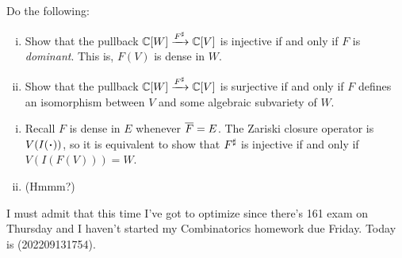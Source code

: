 \documentclass[12pt]{memoir}
\begin{document}
\begin{Ej}[2.5.(1,2)]
  Do the following:
  \begin{enumerate}[i)]
    \itemsep=-0.4em
    \item Show that the pullback $\mathbb{C}[W]\xrightarrow{F^\sharp}\mathbb{C}[V]$ is injective if and only if $F$ is \emph{dominant}. This is, $F(V)$ is dense in $W$.
    \item Show that the pullback $\mathbb{C}[W]\xrightarrow{F^\sharp}\mathbb{C}[V]$ is surjective if and only if $F$ defines an isomorphism between $V$ and some algebraic subvariety of $W$.
  \end{enumerate}
 \end{Ej}
 \begin{ptcbr}
  \begin{enumerate}[i)]
    \itemsep=-0.4em
    \item Recall $F$ is dense in $E$ whenever $\overline F=E$. The Zariski closure operator is $V(I(\.))$, so it is equivalent to show that $F^\sharp$ is injective if and only if $V(I(F(V)))=W$. 
    \item (Hmmm?)
  \end{enumerate}
  I must admit that this time I've got to optimize since there's 161 exam on Thursday and I haven't started my Combinatorics homework due Friday. Today is (202209131754).
 \end{ptcbr}
\end{document}
